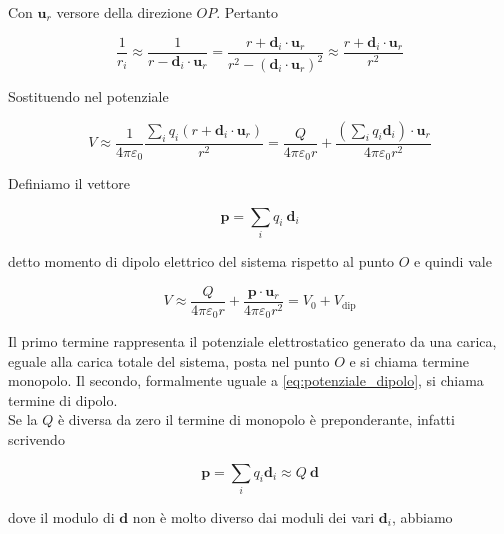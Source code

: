 Con $\mathbf{u}_r$ versore della direzione $OP$. Pertanto

\begin{equation}
    \frac{1}{r_i} \approx \frac{1}{r -\mathbf{d}_i \cdot \mathbf{u}_r} = \frac{r + \mathbf{d}_i \cdot \mathbf{u}_r}{r^2 - (\mathbf{d}_i \cdot \mathbf{u}_r)^2} \approx \frac{r + \mathbf{d}_i \cdot \mathbf{u}_r}{r^2 }
\end{equation}

Sostituendo nel potenziale 

\begin{equation}
    V \approx \frac{1}{4 \pi \varepsilon_0} \frac{\sum_i q_i (r + \mathbf{d}_i \cdot \mathbf{u}_r)}{r^2} =\frac{Q}{4 \pi \varepsilon_0 r} + \frac{(\sum_i q_i \mathbf{d}_i ) \cdot \mathbf{u}_r}{4 \pi \varepsilon_0 r^2}
\end{equation}

Definiamo il vettore 

\begin{equation}
    \mathbf{p} = \sum_i q_i \ \mathbf{d} _i
\end{equation}

detto momento di dipolo elettrico del sistema rispetto al punto $O$ e quindi vale 

\begin{tcolorbox}[colback=yellow!10!white, colframe=orange!70!black, boxrule=0.8pt]
\begin{equation}
    V \approx \frac{Q}{4 \pi \varepsilon_0 r} + \frac{\mathbf{p} \cdot \mathbf{u}_r}{4 \pi \varepsilon_0 r^2} = V_0 + V_{\text{dip}}
\end{equation}
\end{tcolorbox}

\newpage

Il primo termine  rappresenta il potenziale elettrostatico generato da una carica, eguale alla carica totale del sistema, posta nel punto $O$ e si chiama termine monopolo. Il secondo, formalmente uguale a \ref{eq:potenziale_dipolo}, si chiama termine di dipolo. \\

Se la $Q$ è diversa da zero il termine di monopolo è preponderante, infatti scrivendo 

\begin{equation*}
    \mathbf{p} = \sum_i q_i \mathbf{d}_i \approx Q \ \mathbf{d}
\end{equation*}

dove il modulo di $\mathbf{d}$ non è molto diverso dai moduli dei vari $\mathbf{d}_i$, abbiamo

